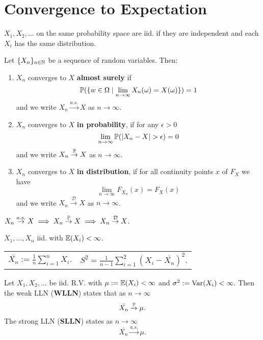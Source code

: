 \section{Convergence to Expectation}

\begin{definition*}
  \(X_1, X_2, \ldots\) on the same probability space are iid. if they are independent and each \(X_i\) has the same distribution.
\end{definition*}

\begin{definition*}
  Let \(\{X_n\}_{n \in \N}\) be a sequence of random variables. Then:
  \begin{enumerate}
    \item \(X_n\) converges to \(X\) \textbf{almost surely} if
    \[\P(\{w \in \Omega \mid \lim_{n\to\infty} X_n(\omega) = X(\omega)\}) = 1\]
    and we write \(X_n \stackrel{a.s.}{\to} X\) as \(n \to \infty\).
    \item \(X_n\) converges to \(X\) \textbf{in probability}, if for any \(\epsilon > 0\)
    \[\lim_{n \to \infty} \P(|X_n - X| > \epsilon) = 0\]
    and we write \(X_n \stackrel{\P}{\to} X\) as \(n \to \infty\).
    \item \(X_n\) converges to \(X\) \textbf{in distribution}, if for all continuity points \(x\) of \(F_X\) we have
    \[\lim_{n \to \infty} F_{X_n}(x) = F_X(x)\]
    and we write \(X_n \stackrel{\mathcal{D}}{\to} X\) as \(n \to \infty\).
  \end{enumerate}
\end{definition*}

\begin{lemma}
  \(X_n \stackrel{a.s.}{\to} X \implies X_n \stackrel{\P}{\to} X \implies X_n \stackrel{\mathcal{D}}{\to} X\).
\end{lemma}

\begin{definition*}
    \(X_1, \ldots, X_n\) iid. with \(\E(X_i) < \infty\).

    \begin{tabularx}{\linewidth}{ll}
      \(\bar{X_n} := \frac{1}{n}\sum_{i=1}^n X_i.\) & \(S^2 = \frac{1}{n-1}\sum_{i=1}^2(X_i - \bar{X_n})^2.\)
    \end{tabularx}
\end{definition*}

\begin{theorem*}
  Let \(X_1, X_2, \ldots\) be iid. R.V. with \(\mu := \E(X_i) < \infty\) and \(\sigma^2 := \Var(X_i) < \infty\). Then the weak LLN (\textbf{WLLN}) states that as \(n \to \infty\)
  \[\bar{X_n} \stackrel{\P}{\to} \mu.\]
  The strong LLN (\textbf{SLLN}) states as \(n \to \infty\)
  \[\bar{X_n} \stackrel{a.s.}{\to} \mu.\]
\end{theorem*}

